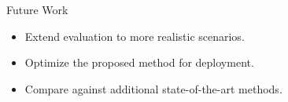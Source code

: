 \begin{frame}{Future Work}

\begin{itemize}
    \item Extend evaluation to more realistic scenarios.
    \item Optimize the proposed method for deployment.
    \item Compare against additional state-of-the-art methods.
\end{itemize}

\end{frame}
